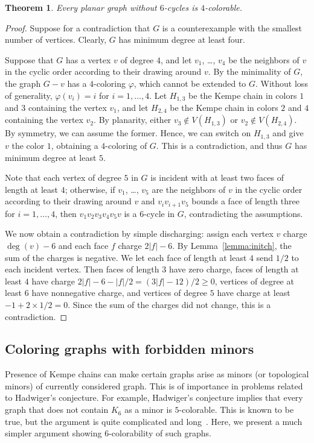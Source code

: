 \documentclass[12pt,twoside,openright,a4paper]{book}
\newtheorem{theorem}{Theorem}[chapter]
\begin{document}
\begin{theorem}\label{thm:forb6}
Every planar graph without $6$-cycles is $4$-colorable.
\end{theorem}
\begin{proof}
Suppose for a contradiction that $G$ is a counterexample with the smallest number of vertices.
Clearly, $G$ has minimum degree at least four.

Suppose that $G$ has a vertex $v$ of degree $4$, and let $v_1$, \ldots, $v_4$ 
be the neighbors of $v$ in the cyclic order according to their drawing around $v$.
By the minimality of $G$, the graph $G-v$ has a $4$-coloring $\varphi$, which cannot be extended to $G$.
Without loss of generality, $\varphi(v_i)=i$
for $i=1,\ldots, 4$.  Let $H_{1,3}$ be the Kempe chain in colors $1$ and $3$ containing the vertex $v_1$,
and let $H_{2,4}$ be the Kempe chain in colors $2$ and $4$ containing the vertex $v_2$.
By planarity, either $v_3\not\in V(H_{1,3})$ or $v_2\not\in V(H_{2,4})$.
By symmetry, we can assume the former.  Hence, we can switch on $H_{1,3}$ and give $v$ the color $1$,
obtaining a $4$-coloring of $G$.  This is a contradiction, and thus $G$ has minimum degree at least $5$.

Note that each vertex of degree $5$ in $G$ is incident with at least two faces of length at least $4$;
otherwise, if $v_1$, \ldots, $v_5$ are the neighbors of $v$ in the cyclic order according to their drawing around $v$
and $v_iv_{i+1}v_5$ bounds a face of length three for $i=1, \ldots, 4$, then $v_1v_2v_3v_4v_5v$ is a $6$-cycle in $G$,
contradicting the assumptions.

We now obtain a contradiction by simple discharging: assign each vertex $v$ charge $\deg(v) - 6$ and each face $f$ charge $2|f|-6$.
By Lemma~\ref{lemma:initch}, the sum of the charges is negative.  We let each face of length at least $4$ send $1/2$ to each incident
vertex.  Then faces of length $3$ have zero charge, faces of length at least $4$ have charge $2|f|-6-|f|/2=(3|f|-12)/2\ge 0$,
vertices of degree at least $6$ have nonnegative charge, and vertices of degree $5$ have charge at least $-1+2\times1/2=0$.
Since the sum of the charges did not change, this is a contradiction.
\end{proof}

\subsection{Coloring graphs with forbidden minors}

Presence of Kempe chains can make certain graphs arise as minors (or topological minors) of currently
considered graph.  This is of importance in problems related to Hadwiger's conjecture.  For example, Hadwiger's conjecture
implies that every graph that does not contain $K_6$ as a minor is $5$-colorable.  This is known to be true, but the argument
is quite complicated and long~\cite{robertsonseymourthomas}.  Here, we present a much simpler argument showing $6$-colorability
of such graphs.
\end{document}

